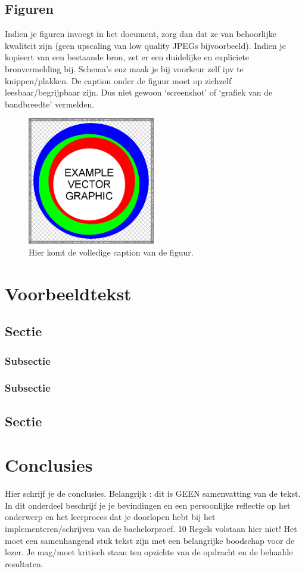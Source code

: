 \documentclass{book}
\newcommand{\CaptionFontSize}{\small}
\begin{document}
\section{Figuren}

Indien je figuren invoegt in het document, zorg dan dat ze van behoorlijke kwaliteit zijn (geen upscaling van low quality JPEGs bijvoorbeeld). Indien je kopieert van een bestaande bron, zet er een duidelijke en expliciete bronvermelding bij. Schema's enz maak je bij voorkeur zelf ipv te knippen/plakken. De caption onder de figuur moet op zichzelf leesbaar/begrijpbaar zijn. Dus niet gewoon `screenshot' of `grafiek van de bandbreedte' vermelden. 

\begin{figure}
\centering\CaptionFontSize
\includegraphics[height=15em]
{fig1}
\caption[]
{Hier komt de volledige caption van de figuur.}
\label{Figure:ChapAbbr:FigureExampleA}
\end{figure}


\chapter{Voorbeeldtekst}
\label{Tekst}

\lipsum{}
\section{Sectie}
\lipsum{}
\subsection{Subsectie}
\lipsum{}
\subsection{Subsectie}
\lipsum{}
\section{Sectie}
\lipsum{}


\chapter{Conclusies}
\label{Conclusies}

Hier schrijf je de conclusies. Belangrijk : dit is GEEN samenvatting van de tekst. In dit onderdeel beschrijf je je bevindingen en een persoonlijke reflectie op het onderwerp en het leerproces dat je doorlopen hebt bij het implementeren/schrijven van de bachelorproef. 10 Regels volstaan hier niet! Het moet een samenhangend stuk tekst zijn met een belangrijke boodschap voor de lezer. Je mag/moet kritisch staan ten opzichte van de opdracht en de behaalde resultaten.
\end{document}
